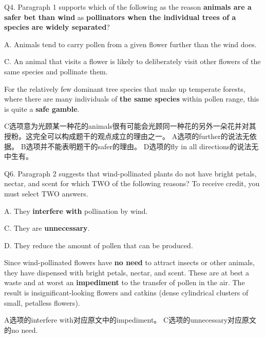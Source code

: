 \begin{blk}
    \begin{qst}
        Q4. Paragraph 1 supports which of the following as the reason \textbf{animals are a safer bet than wind} as \textbf{pollinators when the individual trees of a species are widely separated}?
    \end{qst}

    \begin{chc}
        A. Animals tend to carry pollen from a given flower further than the wind does.

        C. An animal that visits a flower is likely to deliberately visit other flowers of the same species and pollinate them.
    \end{chc}

    \begin{psgq}
        For the relatively few dominant tree species that make up temperate forests, where there are many individuals of \textbf{the same species} within pollen range, this is quite a \textbf{safe gamble}.
    \end{psgq}

    \begin{nlz}
        C选项意为光顾某一种花的animals很有可能会光顾同一种花的另外一朵花并对其授粉。这完全可以构成题干的观点成立的理由之一。 A选项的further的说法无依据。 B选项并不能表明题干的safer的理由。 D选项的fly in all directions的说法无中生有。
    \end{nlz}
\end{blk}

\begin{blk}
    \begin{qst}
        Q6. Paragraph 2 suggests that wind-pollinated plants do not have bright petals, nectar, and scent for which TWO of the following reasons? To receive credit, you must select TWO answers.
    \end{qst}

    \begin{chc}
        A. They \textbf{interfere with} pollination by wind.

        C. They are \textbf{unnecessary}.

        D. They reduce the amount of pollen that can be produced.
    \end{chc}

    \begin{psgq}
        Since wind-pollinated flowers have \textbf{no need} to attract insects or other animals, they have dispensed with bright petals, nectar, and scent. These are at best a waste and at worst an \textbf{impediment} to the transfer of pollen in the air. The result is insignificant-looking flowers and catkins (dense cylindrical clusters of small, petalless flowers).
    \end{psgq}

    \begin{nlz}
        A选项的interfere with对应原文中的impediment。 C选项的unnecessary对应原文的no need.
    \end{nlz}
\end{blk}

\newpage